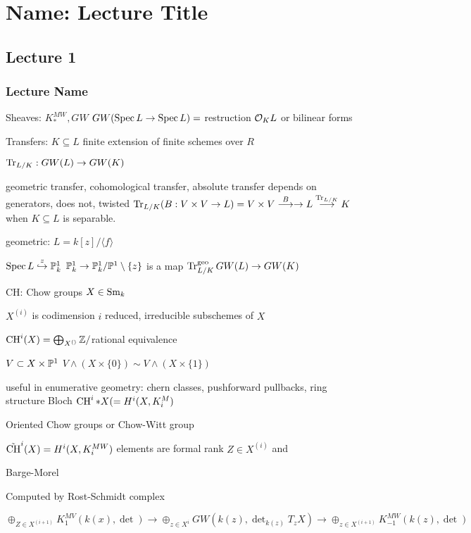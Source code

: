 \newpage
\section{Name: Lecture Title}
\subsection{Lecture 1}
\subsubsection{Lecture Name}

Sheaves: $K^{MW}_*, GW$
$GW(\spec L \to \spec L)= $ restruction $\O_K L$ or bilinear forms

Transfers: $K \subseteq L$ finite extension of finite schemes over $R$

$\tr_{L/K}: GW(L) \to GW(K)$

geometric transfer, cohomological transfer, absolute transfer
depends on generators, does not, twisted
$\tr_{L/K}(B: V \times V \to L)= V \times V \ma{B} \to L \ma{\tr_{L/K}} K$ when $K \subseteq L$ is separable. 


geometric: $L= k[z]/ \langle f \rangle$

$\spec L \stackrel{z}{\hookrightarrow} \P_k^1$
$\P^1_k \to \P_k^1/\P^1 \setminus \{z\}$ is a map $\tr_{L/K}^\text{geo} GW(L) \to GW(K)$

CH: Chow groups $X \in \sm_k$

$X^{(i)}$ is codimension $i$ reduced, irreducible subschemes of $X$

$\ch^i(X)= \bigoplus_{X^{()}} \Z/$rational equivalence

$V \subset X \times \P^1$
$V \wedge (X \times \{0\}) \sim V \wedge (X \times \{1\})$

useful in enumerative geometry: chern classes, pushforward pullbacks, ring structure
Bloch $\ch^i*X(= H^i(X,K_i^{M})$ 



Oriented Chow groups or Chow-Witt group

$\tilde{\ch}^i(X)= H^i(X, K_i^{MW})$ elements are formal rank $Z \in X^{(i)}$ and 

Barge-Morel

Computed by Rost-Schmidt complex

$\oplus_{Z \in X^{(i+1)}} K_1^{MV}(k(x),\det) \to \oplus_{z \in X^{i}} GW(k(z),\det_{k(z)} T_zX) \to \oplus_{z \in X^{(i+1)}} K_{-1}^{MW} (k(z),\det)$


